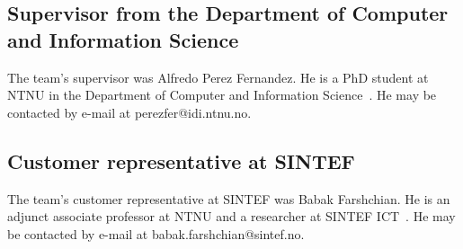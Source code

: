 \subsection{Supervisor from the Department of Computer and Information Science}
The team's supervisor was Alfredo Perez Fernandez. He is a PhD student at NTNU in the Department of Computer and Information Science~\cite{idi}. He may be contacted by e-mail at perezfer@idi.ntnu.no.

\subsection{Customer representative at SINTEF}
The team's customer representative at SINTEF was Babak Farshchian. He is an adjunct associate professor at NTNU and a researcher at SINTEF ICT~\cite{sintefict}. He may be contacted by e-mail at babak.farshchian@sintef.no.
